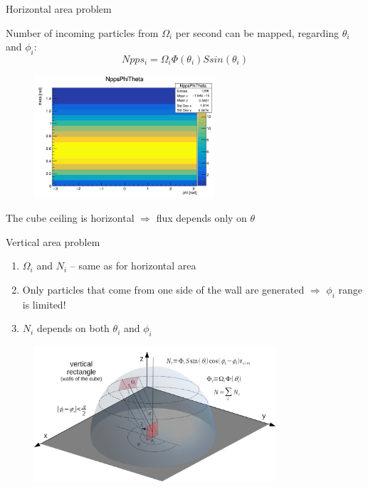 \documentclass{beamer}
\begin{document}
\begin{frame}{Horizontal area problem}

Number of incoming particles from $\Omega_i$ per second can be mapped, regarding $\theta_i$ and $\phi_i$:
\[
Npps_i =  \Omega_i \Phi(\theta_i) S sin(\theta_i)
\]
\begin{figure}
\includegraphics[width=0.6\textwidth]{images/CeilingFluxMap.png}
\end{figure}
The cube ceiling is horizontal $\Rightarrow$ flux depends only on $\theta$
\end{frame}

\begin{frame}{Vertical area problem}

\begin{enumerate}
\item $\Omega_i$ and $N_i$ -- same as for horizontal area
\item Only particles that come from one side of the wall are generated $\Rightarrow$ $\phi_i$ range is limited!
\item $N_i$ depends on both $\theta_i$ and $\phi_i$
\end{enumerate}

\begin{figure}
\includegraphics[width=0.8\textwidth]{images/ver.png}
\end{figure}
\end{frame}
\end{document}
